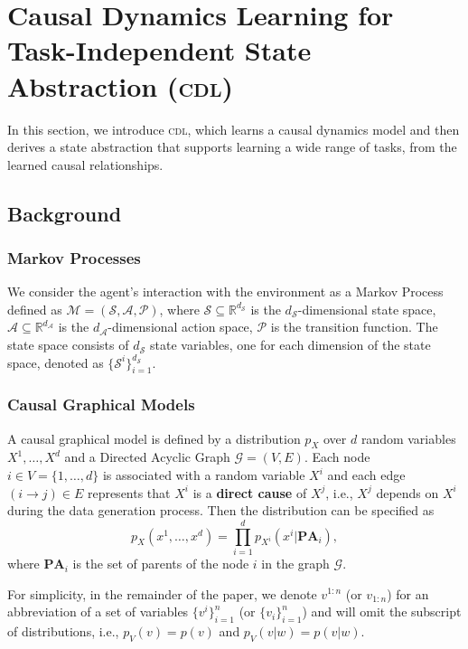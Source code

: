 \section{Causal Dynamics Learning for Task-Independent State Abstraction (\textsc{cdl})}
\label{sec:approach}
In this section, we introduce \textsc{cdl}, which learns a causal dynamics model and then derives a state abstraction that supports learning a wide range of tasks, from the learned causal relationships.

\subsection{Background}
\subsubsection{Markov Processes}

We consider the agent's interaction with the environment as a Markov Process defined as $\mathcal{M} = (\mathcal{S}, \mathcal{A}, \mathcal{P})$, where $\mathcal{S} \subseteq \mathbb{R}^{d_\mathcal{S}}$ is the $d_\mathcal{S}$-dimensional state space, $\mathcal{A} \subseteq \mathbb{R}^{d_\mathcal{A}}$ is the $d_\mathcal{A}$-dimensional action space, $\mathcal{P}$ is the transition function. The state space consists of $d_\mathcal{S}$ state variables, one for each dimension of the state space, denoted as $\{\mathcal{S}^i\}_{i=1}^{d_\mathcal{S}}$. 


\subsubsection{Causal Graphical Models}
\label{subsec:causal_graphical_model}
A causal graphical model \cite{pearl2009causality} is defined by a distribution $p_X$ over $d$ random variables $X^1, \dots, X^d$ and a Directed Acyclic Graph $\mathcal{G}=(V, E)$. Each node $i \in V = \{1, \dots, d\}$ is associated with a random variable $X^i$ and each edge $(i \rightarrow j) \in E$ represents that $X^i$ is a \textbf{direct cause} of $X^j$, i.e., $X^j$ depends on $X^i$ during the data generation process. 
Then the distribution can be specified as
\begin{equation}
    p_X(x^1, \dots, x^d) = \prod_{i=1}^d p_{X^i}(x^i | \textbf{PA}_i),
    \label{eq:causal_graphical_model}
\end{equation}
where $\textbf{PA}_i$ is the set of parents of the node $i$ in the graph $\mathcal{G}$.

For simplicity, in the remainder of the paper, we denote $v^{1:n}$ (or $v_{1:n}$) for an abbreviation of a set of variables $\{v^i\}_{i=1}^n$ (or $\{v_i\}_{i=1}^n$) and will omit the subscript of distributions, i.e., $p_V(v) = p(v)$ and $p_V(v | w) = p(v | w)$.




